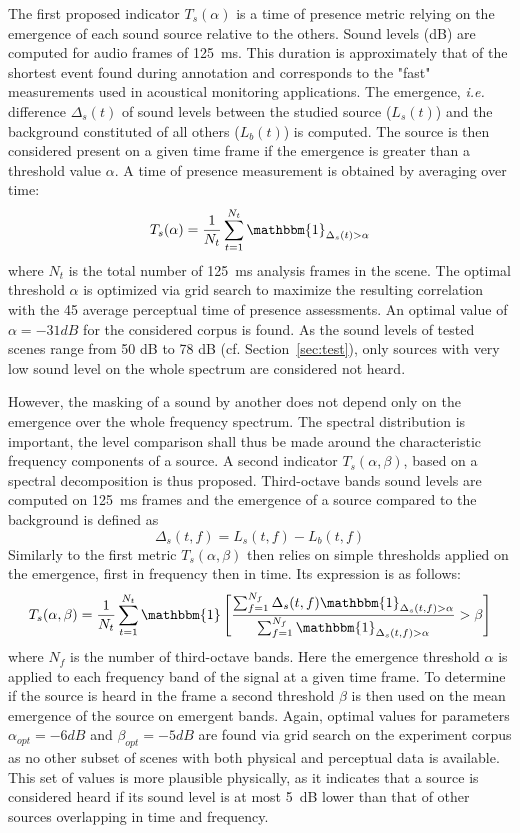 \documentclass{article}
\begin{document}
\begin{sloppy}
The first proposed indicator $T_s(\alpha)$ is a time of presence metric relying on the emergence of each sound source relative to the others. Sound levels (dB) are computed for audio frames of 125~ms. This duration is approximately that of the shortest event found during annotation and corresponds to the "fast" measurements used in acoustical monitoring applications. The emergence, \textit{i.e.} difference $\Delta_s(t)$ of sound levels between the studied source ($L_s(t)$) and the background constituted of all others ($L_b(t)$) is computed. The source is then considered present on a given time frame if the emergence is greater than a threshold value $\alpha$. A time of presence measurement is obtained by averaging over time:
\begin{equation}
T_s(\alpha) = \frac{1}{N_t}\sum_{t = 1}^{N_t}\mathbbm{1}_{\Delta_s(t)>\alpha}
\end{equation}
where $N_t$ is the total number of 125~ms analysis frames in the scene. The optimal threshold $\alpha$ is optimized via grid search to maximize the resulting correlation with the 45 average perceptual time of presence assessments. An optimal value of $\alpha = -31dB$ for the considered corpus is found. As the sound levels of tested scenes range from 50 dB to 78 dB (cf. Section~\ref{sec:test}), only sources with very low sound level on the whole spectrum are considered not heard.

However, the masking of a sound by another does not depend only on the emergence over the whole frequency spectrum. The spectral distribution is important, the level comparison shall thus be made around the characteristic frequency components of a source. A second indicator $T_s(\alpha, \beta)$, based on a spectral decomposition is thus proposed. Third-octave bands sound levels are computed on 125~ms frames and the emergence of a source compared to the background is defined as
\begin{equation}
\Delta_s(t, f) = L_s(t, f) - L_b(t, f)
\end{equation}
Similarly to the first metric $T_s(\alpha, \beta)$ then relies on simple thresholds applied on the emergence, first in frequency then in time. Its expression is as follows:
\begin{equation}
T_s(\alpha, \beta) = \frac{1}{N_t}\sum_{t = 1}^{N_t}\mathbbm{1}\left[ \frac{\sum_{f = 1}^{N_f}\Delta_s(t, f)\mathbbm{1}_{\Delta_s(t, f)>\alpha}}{\sum_{f = 1}^{N_f}\mathbbm{1}_{\Delta_s(t, f)>\alpha}}>\beta \right]
\end{equation}
where $N_f$ is the number of third-octave bands. Here the emergence threshold $\alpha$ is applied to each frequency band of the signal at a given time frame. To determine if the source is heard in the frame a second threshold $\beta$ is then used on the mean emergence of the source on emergent bands. Again, optimal values for parameters $\alpha_{opt} = -6 dB$ and $\beta_{opt} = -5 dB$ are found via grid search on the experiment corpus as no other subset of scenes with both physical and perceptual data is available. This set of values is more plausible physically, as it indicates that a source is considered heard if its sound level is at most 5~dB lower than that of other sources overlapping in time and frequency.


\end{sloppy}
\end{document}
